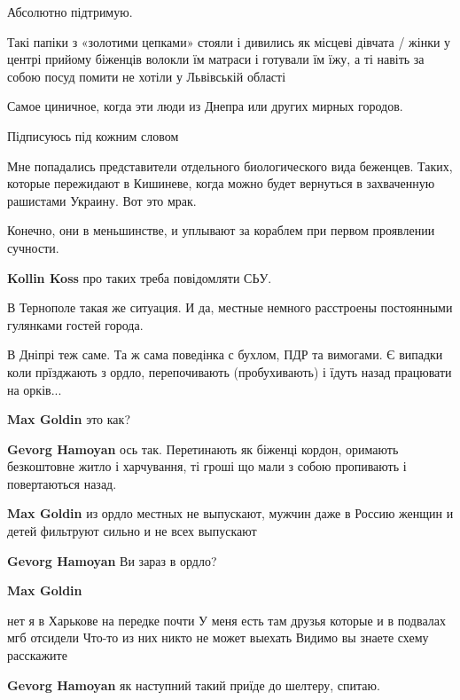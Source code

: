 \begin{itemize}
Абсолютно підтримую.


Такі папіки з «золотими цепками» стояли і дивились як місцеві дівчата / жінки у
центрі прийому біженців волокли їм матраси і готували їм їжу, а ті навіть за
собою посуд помити не хотіли у Львівській області

Самое циничное, когда эти люди из Днепра или других мирных городов.

Підписуюсь під кожним словом


Мне попадались представители отдельного биологического вида беженцев. Таких,
которые пережидают в Кишиневе, когда можно будет вернуться в захваченную
рашистами Украину. Вот это мрак.

Конечно, они в меньшинстве, и уплывают за кораблем при первом проявлении
сучности.

\textbf{Kollin Koss} про таких треба повідомляти СЬУ.

В Тернополе такая же ситуация. И да, местные немного расстроены постоянными гулянками гостей города.


В Дніпрі теж саме. Та ж сама поведінка с бухлом, ПДР та вимогами. Є випадки
коли прїзджають з ордло, перепочивають (пробухивають) і їдуть назад працювати
на орків...

\begin{itemize} %
\textbf{Max Goldin} это как?

\textbf{Gevorg Hamoyan} ось так. Перетинають як біженці кордон, оримають безкоштовне житло і харчування, ті гроші що мали з собою пропивають і повертаються назад.

\textbf{Max Goldin} из ордло местных не выпускают, мужчин даже в Россию женщин и детей фильтруют сильно и не всех выпускают

\textbf{Gevorg Hamoyan} Ви зараз в ордло?

\textbf{Max Goldin} 

\obeycr
нет я в Харькове на передке почти
У меня есть там друзья которые и в подвалах мгб отсидели
Что-то из них никто не может выехать
Видимо вы знаете схему расскажите
\restorecr

\textbf{Gevorg Hamoyan} як наступний такий приїде до шелтеру, спитаю.


\end{itemize}
\end{itemize}
